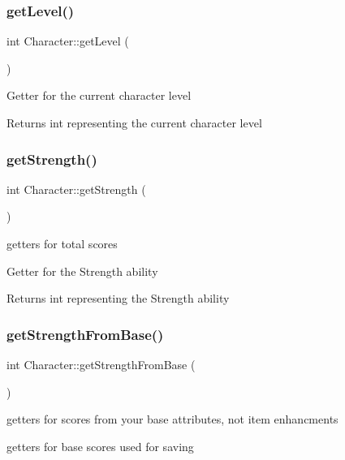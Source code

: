 \subsubsection{\texorpdfstring{get\+Level()}{getLevel()}}
{\footnotesize\ttfamily int Character\+::get\+Level (\begin{DoxyParamCaption}{ }\end{DoxyParamCaption})}

Getter for the current character level \begin{DoxyReturn}{Returns}
int representing the current character level 
\end{DoxyReturn}
\hypertarget{classCharacter_a8ccbb82b13e59f02c9df0b321fae577d}{}\label{classCharacter_a8ccbb82b13e59f02c9df0b321fae577d} 
\subsubsection{\texorpdfstring{get\+Strength()}{getStrength()}}
{\footnotesize\ttfamily int Character\+::get\+Strength (\begin{DoxyParamCaption}{ }\end{DoxyParamCaption})}



getters for total scores 

Getter for the Strength ability \begin{DoxyReturn}{Returns}
int representing the Strength ability 
\end{DoxyReturn}
\hypertarget{classCharacter_a0c9f1088f6b98c5fb5080267dd7cde49}{}\label{classCharacter_a0c9f1088f6b98c5fb5080267dd7cde49} 
\subsubsection{\texorpdfstring{get\+Strength\+From\+Base()}{getStrengthFromBase()}}
{\footnotesize\ttfamily int Character\+::get\+Strength\+From\+Base (\begin{DoxyParamCaption}{ }\end{DoxyParamCaption})}



getters for scores from your base attributes, not item enhancments 

getters for base scores used for saving \hypertarget{classCharacter_a51e80d6194b8c0f4558b593c8e9b58f6}{}\label{classCharacter_a51e80d6194b8c0f4558b593c8e9b58f6} 

